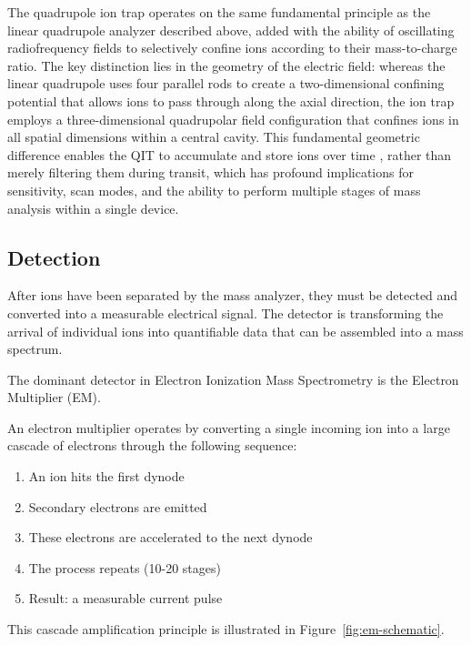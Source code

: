 The quadrupole ion trap operates on the same fundamental principle as the linear quadrupole analyzer described above, added with the ability of oscillating radiofrequency fields to selectively confine ions according to their mass-to-charge ratio. \cite[p.~1156]{Raffaelli2021}
The key distinction lies in the geometry of the electric field: whereas the linear quadrupole uses four parallel rods to create a two-dimensional confining potential that allows ions to pass through along the axial direction, the ion trap employs a three-dimensional quadrupolar field configuration that confines ions in all spatial dimensions within a central cavity. \cite[p.~962]{March2009}
This fundamental geometric difference enables the QIT to accumulate and store ions over time \cite[p.~973]{March2009}, rather than merely filtering them during transit, which has profound implications for sensitivity, scan modes, and the ability to perform multiple stages of mass analysis within a single device. \cite[p.~984]{March2009}


\subsection{Detection}

After ions have been separated by the mass analyzer, they must be detected and converted into a measurable electrical signal. \cite[pp.~5-6]{Dass2007}
The detector is transforming the arrival of individual ions into quantifiable data that can be assembled into a mass spectrum. \cite[p.~103]{Dass2007}

The dominant detector in Electron Ionization Mass Spectrometry is the Electron Multiplier (EM). 
\cite[p.~103]{Dass2007}

An electron multiplier operates by converting a single incoming ion into a large cascade of electrons through the following sequence:

\begin{enumerate}
    \item An ion hits the first dynode
    \item Secondary electrons are emitted
    \item These electrons are accelerated to the next dynode
    \item The process repeats (10-20 stages)
    \item Result: a measurable current pulse
\end{enumerate}

This cascade amplification principle is illustrated in Figure~\ref{fig:em-schematic}.


